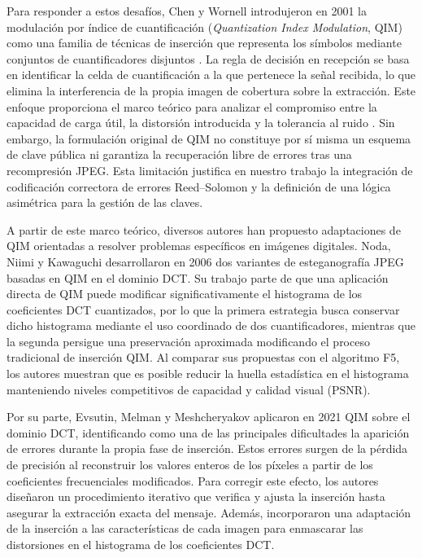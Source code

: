 \documentclass[IB]{TFUOC}%
\begin{document}
Para responder a estos desafíos, Chen y Wornell introdujeron en 2001 la modulación por índice de cuantificación (\textit{Quantization Index Modulation}, QIM) como una familia de técnicas de inserción que representa los símbolos mediante conjuntos de cuantificadores disjuntos \cite{11}. La regla de decisión en recepción se basa en identificar la celda de cuantificación a la que pertenece la señal recibida, lo que elimina la interferencia de la propia imagen de cobertura sobre la extracción. Este enfoque proporciona el marco teórico para analizar el compromiso entre la capacidad de carga útil, la distorsión introducida y la tolerancia al ruido \cite{11}. Sin embargo, la formulación original de QIM no constituye por sí misma un esquema de clave pública ni garantiza la recuperación libre de errores tras una recompresión JPEG. Esta limitación justifica en nuestro trabajo la integración de codificación correctora de errores Reed--Solomon y la definición de una lógica asimétrica para la gestión de las claves.

A partir de este marco teórico, diversos autores han propuesto adaptaciones de QIM orientadas a resolver problemas específicos en imágenes digitales. Noda, Niimi y Kawaguchi \cite{15} desarrollaron en 2006 dos variantes de esteganografía JPEG basadas en QIM en el dominio DCT. Su trabajo parte de que una aplicación directa de QIM puede modificar significativamente el histograma de los coeficientes DCT cuantizados, por lo que la primera estrategia busca conservar dicho histograma mediante el uso coordinado de dos cuantificadores, mientras que la segunda persigue una preservación aproximada modificando el proceso tradicional de inserción QIM. Al comparar sus propuestas con el algoritmo F5, los autores muestran que es posible reducir la huella estadística en el histograma manteniendo niveles competitivos de capacidad y calidad visual ($\mathrm{PSNR}$).

Por su parte, Evsutin, Melman y Meshcheryakov \cite{14} aplicaron en 2021 QIM sobre el dominio DCT, identificando como una de las principales dificultades la aparición de errores durante la propia fase de inserción. Estos errores surgen de la pérdida de precisión al reconstruir los valores enteros de los píxeles a partir de los coeficientes frecuenciales modificados. Para corregir este efecto, los autores diseñaron un procedimiento iterativo que verifica y ajusta la inserción hasta asegurar la extracción exacta del mensaje. Además, incorporaron una adaptación de la inserción a las características de cada imagen para enmascarar las distorsiones en el histograma de los coeficientes DCT.
\end{document}
